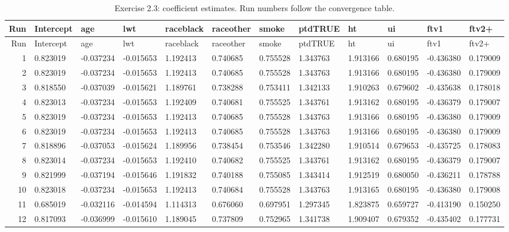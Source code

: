 \begin{landscape}
\scriptsize
\begin{longtable}{rlllllllllll}
\caption{Exercise 2.3: coefficient estimates. Run numbers follow the convergence table.}\\
\toprule
Run & Intercept & age & lwt & raceblack & raceother & smoke & ptdTRUE & ht & ui & ftv1 & ftv2+ \\
\midrule
\endfirsthead
\toprule
Run & Intercept & age & lwt & raceblack & raceother & smoke & ptdTRUE & ht & ui & ftv1 & ftv2+ \\
\midrule
\endhead
1 & 0.823019 & -0.037234 & -0.015653 & 1.192413 & 0.740685 & 0.755528 & 1.343763 & 1.913166 & 0.680195 & -0.436380 & 0.179009 \\
2 & 0.823019 & -0.037234 & -0.015653 & 1.192413 & 0.740685 & 0.755528 & 1.343763 & 1.913166 & 0.680195 & -0.436380 & 0.179009 \\
3 & 0.818550 & -0.037039 & -0.015621 & 1.189761 & 0.738288 & 0.753411 & 1.342133 & 1.910263 & 0.679602 & -0.435638 & 0.178018 \\
4 & 0.823013 & -0.037234 & -0.015653 & 1.192409 & 0.740681 & 0.755525 & 1.343761 & 1.913162 & 0.680195 & -0.436379 & 0.179007 \\
5 & 0.823019 & -0.037234 & -0.015653 & 1.192413 & 0.740685 & 0.755528 & 1.343763 & 1.913166 & 0.680195 & -0.436380 & 0.179009 \\
6 & 0.823019 & -0.037234 & -0.015653 & 1.192413 & 0.740685 & 0.755528 & 1.343763 & 1.913166 & 0.680195 & -0.436380 & 0.179009 \\
7 & 0.818896 & -0.037053 & -0.015624 & 1.189956 & 0.738454 & 0.753546 & 1.342280 & 1.910514 & 0.679653 & -0.435725 & 0.178083 \\
8 & 0.823014 & -0.037234 & -0.015653 & 1.192410 & 0.740682 & 0.755525 & 1.343761 & 1.913162 & 0.680195 & -0.436379 & 0.179007 \\
9 & 0.821999 & -0.037194 & -0.015646 & 1.191832 & 0.740188 & 0.755085 & 1.343414 & 1.912519 & 0.680050 & -0.436211 & 0.178788 \\
10 & 0.823018 & -0.037234 & -0.015653 & 1.192413 & 0.740684 & 0.755528 & 1.343763 & 1.913165 & 0.680195 & -0.436380 & 0.179008 \\
11 & 0.685019 & -0.032116 & -0.014594 & 1.114313 & 0.676060 & 0.697951 & 1.297345 & 1.823875 & 0.659727 & -0.413190 & 0.150250 \\
12 & 0.817093 & -0.036999 & -0.015610 & 1.189045 & 0.737809 & 0.752965 & 1.341738 & 1.909407 & 0.679352 & -0.435402 & 0.177731 \\

\end{longtable}
\end{landscape}
